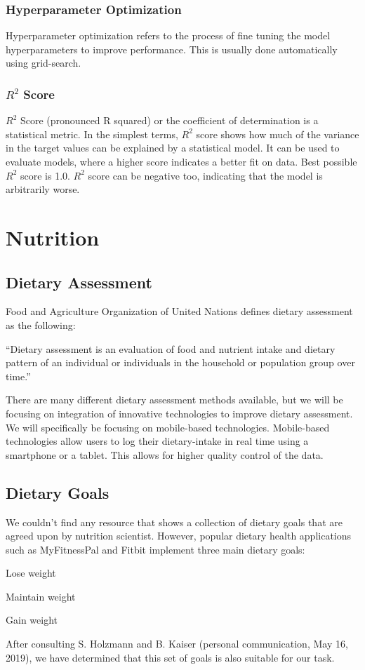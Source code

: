 \subsubsection{Hyperparameter Optimization}
Hyperparameter optimization refers to the process of fine tuning the model hyperparameters to improve performance.
This is usually done automatically using grid-search.\parencite{homl:2} 

\subsubsection{$R^2$ Score}
$R^2$ Score (pronounced R squared) or the coefficient of determination is a statistical metric.
In the simplest terms, $R^2$ score shows how much of the variance in the target values can be explained by a statistical model.
It can be used to evaluate models, where a higher score indicates a better fit on data.
Best possible $R^2$ score is 1.0.
$R^2$ score can be negative too, indicating that the model is arbitrarily worse.\parencite{r2score}


\section{Nutrition}
\subsection{Dietary Assessment}
Food and Agriculture Organization of United Nations defines dietary assessment as the following:

``Dietary assessment is an evaluation of food and nutrient intake and dietary pattern of an individual or individuals in the household or population group over time.''
\parencite{faoun}

There are many different dietary assessment methods available, but we will be focusing on integration of innovative technologies to improve dietary assessment.
We will specifically be focusing on mobile-based technologies.
Mobile-based technologies allow users to log their dietary-intake in real time using a smartphone or a tablet.
This allows for higher quality control of the data.\parencite{faoun}
\subsection{Dietary Goals}
We couldn't find any resource that shows a collection of dietary goals that are agreed upon by nutrition scientist.
However, popular dietary health applications such as MyFitnessPal and Fitbit implement three main dietary goals:

Lose weight

Maintain weight

Gain weight

After consulting S. Holzmann and B. Kaiser (personal communication, May 16, 2019), we have determined that this set of goals is also suitable for our task.
